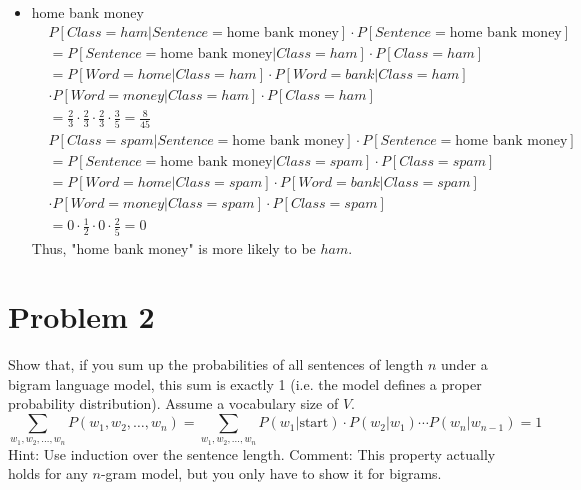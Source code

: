 \documentclass[twoside,11pt]{homework}
\begin{document}
\begin{solution}
\begin{itemize}
  \item home bank money
  \[
    \begin{aligned}
      & P[Class = ham | Sentence = \text{home bank money}] \cdot P[Sentence =
      \text{home bank money}] \\
      &= P[Sentence = \text{home bank money} | Class = ham] \cdot P[Class = ham] \\
      &= P[Word = home | Class = ham] \cdot P[Word = bank | Class = ham]\\
      & \cdot P[Word = money | Class = ham] \cdot P[Class = ham] \\
      &= \frac{2}{3} \cdot \frac{2}{3} \cdot \frac{2}{3} \cdot \frac{3}{5} = \frac{8}{45}
    \end{aligned}
  \]
  \[
    \begin{aligned}
      & P[Class = spam | Sentence = \text{home bank money}] \cdot P[Sentence =
      \text{home bank money}] \\
      &= P[Sentence = \text{home bank money} | Class = spam] \cdot P[Class = spam] \\
      &= P[Word = home | Class = spam] \cdot P[Word = bank | Class = spam]\\
      & \cdot P[Word = money | Class = spam] \cdot P[Class = spam] \\
      &= 0 \cdot \frac{1}{2} \cdot 0 \cdot \frac{2}{5} = 0
    \end{aligned}
  \]
  Thus, "home bank money" is more likely to be $ham$.
  \end{itemize}
\end{solution}

\section*{Problem 2}

Show that, if you sum up the probabilities of all sentences of length $n$ under
a bigram language model, this sum is exactly 1 (i.e. the model defines a proper
probability distribution). Assume a vocabulary size of $V$.
\[
  \sum_{w_1, w_2, \dots, w_n} P(w_1, w_2, \dots, w_n) = \sum_{w_1, w_2, \dots, w_n}
  P(w_1 | \text{start}) \cdot P(w_2 | w_1) \cdots P(w_n | w_{n-1}) = 1
\]
Hint: Use induction over the sentence length.
Comment: This property actually holds for any $n$-gram model, but you only have to
show it for bigrams.
\end{document}
